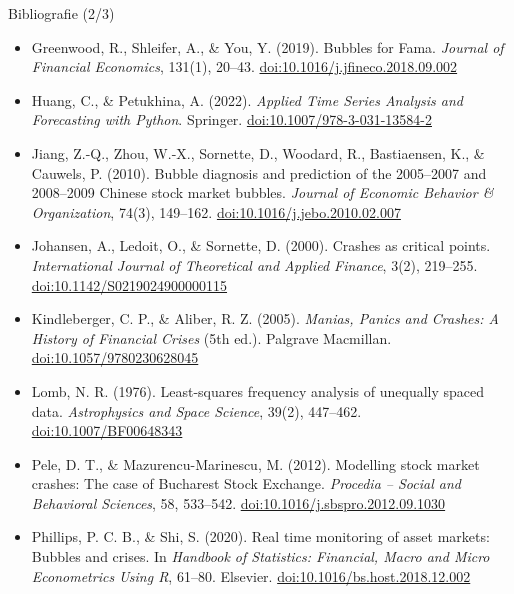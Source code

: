 \begin{frame}{Bibliografie (2/3)}
\itemsize{\scriptsize}
\begin{itemize}
    \item Greenwood, R., Shleifer, A., \& You, Y. (2019). Bubbles for Fama. \textit{Journal of Financial Economics}, 131(1), 20--43. \href{https://doi.org/10.1016/j.jfineco.2018.09.002}{doi:10.1016/j.jfineco.2018.09.002}
    \item Huang, C., \& Petukhina, A. (2022). \textit{Applied Time Series Analysis and Forecasting with Python}. Springer. \href{https://doi.org/10.1007/978-3-031-13584-2}{doi:10.1007/978-3-031-13584-2}
    \item Jiang, Z.-Q., Zhou, W.-X., Sornette, D., Woodard, R., Bastiaensen, K., \& Cauwels, P. (2010). Bubble diagnosis and prediction of the 2005--2007 and 2008--2009 Chinese stock market bubbles. \textit{Journal of Economic Behavior \& Organization}, 74(3), 149--162. \href{https://doi.org/10.1016/j.jebo.2010.02.007}{doi:10.1016/j.jebo.2010.02.007}
    \item Johansen, A., Ledoit, O., \& Sornette, D. (2000). Crashes as critical points. \textit{International Journal of Theoretical and Applied Finance}, 3(2), 219--255. \href{https://doi.org/10.1142/S0219024900000115}{doi:10.1142/S0219024900000115}
    \item Kindleberger, C. P., \& Aliber, R. Z. (2005). \textit{Manias, Panics and Crashes: A History of Financial Crises} (5th ed.). Palgrave Macmillan. \href{https://doi.org/10.1057/9780230628045}{doi:10.1057/9780230628045}
    \item Lomb, N. R. (1976). Least-squares frequency analysis of unequally spaced data. \textit{Astrophysics and Space Science}, 39(2), 447--462. \href{https://doi.org/10.1007/BF00648343}{doi:10.1007/BF00648343}
    \item Pele, D. T., \& Mazurencu-Marinescu, M. (2012). Modelling stock market crashes: The case of Bucharest Stock Exchange. \textit{Procedia -- Social and Behavioral Sciences}, 58, 533--542. \href{https://doi.org/10.1016/j.sbspro.2012.09.1030}{doi:10.1016/j.sbspro.2012.09.1030}
    \item Phillips, P. C. B., \& Shi, S. (2020). Real time monitoring of asset markets: Bubbles and crises. In \textit{Handbook of Statistics: Financial, Macro and Micro Econometrics Using R}, 61--80. Elsevier. \href{https://doi.org/10.1016/bs.host.2018.12.002}{doi:10.1016/bs.host.2018.12.002}
\end{itemize}
\end{frame}

